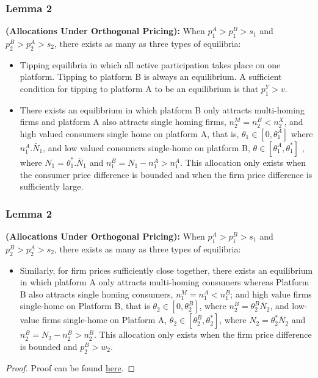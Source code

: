 \documentclass[11pt]{beamer}
\theoremstyle{boldstyle}
\begin{document}
\begin{frame}
	\frametitle{Lemma 2}
	\begin{small}
	\begin{lemma}
\textbf{(Allocations Under Orthogonal Pricing):} When $p_1^A>p_1^B>s_1$ and $p_2^B>p_2^A>s_2$, there exists as many as three types of equilibria:
\begin{itemize}
	\item Tipping equilibria in which all active participation takes place on one platform. Tipping to platform B is always an equilibrium. A sufficient condition for tipping to platform A to be an equilibrium is that $p_1^Y>v$.
	\item There exists an equilibrium in which platform B only attracts multi-homing firms and platform A also attracts single homing firms, $n_2^M=n_2^B<n_2^X$, and high valued consumers single home on platform A, that is, $\theta_1 \in [0,\theta_1^A]$ where $n_1^A.\bar{N}_1$, and low valued consumers single-home on platform B, $\theta \in [\theta_1^A, \theta_1^* ]$ , where $N_1=\theta_1^*.\bar{N}_1$ and $n_1^B=N_1-n_1^A>n_1^A$. This allocation only exists when the consumer price difference is bounded and when the firm price difference is sufficiently large.
\end{itemize}
	
	\end{lemma}
\end{small}


\end{frame}

\begin{frame}
	\frametitle{Lemma 2}
	\begin{small}
	\begin{lemma}
		\textbf{(Allocations Under Orthogonal Pricing):} When $p_1^A>p_1^B>s_1$ and $p_2^B>p_2^A>s_2$, there exists as many as three types of equilibria:
		\begin{itemize}
			\item Similarly, for firm prices sufficiently close together, there exists an equilibrium in which platform A only attracts multi-homing consumers whereas Platform B also attracts single homing consumers, $n_1^M=n_1^A<n_1^B$; and high value firms single-home on Platform B, that is $\theta_2 \in [0,\theta_2^B]$, where $n_2^B=\theta_2^B\bar{N}_2$, and low-value firms single-home on Platform A, $\theta_2 \in [\theta_2^B, \theta_2^*]$, where $N_2=\theta_2^*\bar{N}_2$ and $n_2^B=N_2-n_2^B>n_2^B$. This allocation only exists when the firm price difference is bounded and $p_2^B>w_2$. 
		\end{itemize}
		
	\end{lemma}
	\begin{proof}
		Proof can be found  \href{https://shorturl.at/ZrOPF}{here}.
	\end{proof}
	\end{small}
\end{frame}
\end{document}
